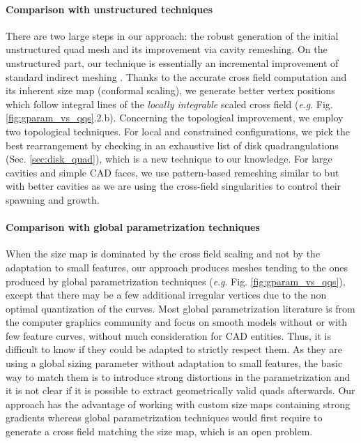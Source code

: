 \documentclass[AMA,STIX1COL]{WileyNJD-v2}
\newcommand{\eg}{\textit{e}.\textit{g}. }
\newcommand\rsec[1]{Sec. \ref{#1}}
\newcommand\rfig[1]{Fig. \ref{#1}}
\begin{document}
{\paragraph{Comparison with unstructured techniques}
There are two large steps in our approach: the robust generation of the
initial unstructured quad mesh and its improvement via cavity remeshing.  On
the unstructured part, our technique is essentially an incremental improvement
of standard indirect meshing \cite{blossom,delquad}. Thanks to the accurate
cross field computation and its inherent size map (conformal scaling), we
generate better vertex positions which follow integral lines of the
\emph{locally integrable} scaled cross field (\eg \rfig{fig:gparam_vs_qqs}.2.b).
Concerning the topological improvement, we employ two topological techniques.
For local and constrained configurations, we pick the best rearrangement by
checking in an exhaustive list of disk quadrangulations (\rsec{sec:disk_quad}),
which is a new technique to our knowledge. For large cavities and simple CAD
faces, we use pattern-based remeshing similar to \cite{verma2015} but with
better cavities as we are using the cross-field singularities to control their
spawning and growth.

\paragraph{Comparison with global parametrization techniques}
When the size map is dominated by the cross field scaling and not by the
adaptation to small features, our approach produces meshes tending to the ones
produced by global parametrization techniques (\eg \rfig{fig:gparam_vs_qqs}),
except that there may be a few additional irregular vertices due to the non
optimal quantization of the curves. Most global parametrization literature is
from the computer graphics community and focus on smooth models without or with
few feature curves, without much consideration for CAD entities. Thus, it is
difficult to know if they could be adapted to strictly respect them. As they
are using a global sizing parameter without adaptation to small features, the
basic way to match them is to introduce strong distortions in the
parametrization and it is not clear if it is possible to extract geometrically
valid quads afterwards. Our approach has the advantage
of working with custom size maps containing strong gradients whereas global
parametrization techniques would first require to generate a cross field
matching the size map, which is an open problem.

}
\end{document}
